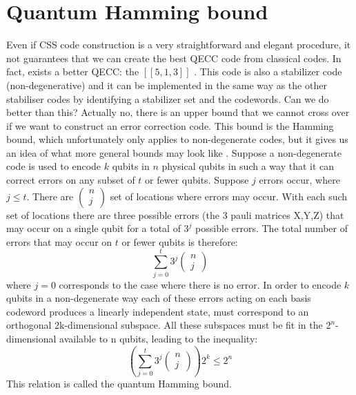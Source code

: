 \section{Quantum Hamming bound}
Even if CSS code construction is a very straightforward and elegant procedure, it not guarantees that we can create the best QECC code from classical codes. In fact, exists a better QECC: the $[[5,1,3]]$ \cite{gottesman1997stabilizer}. This code is also a stabilizer code (non-degenerative) and it can be implemented in the same way as the other stabiliser codes by identifying a stabilizer set and the codewords. Can we do better than this? Actually no, there is an upper bound that we cannot cross over if we want to construct an error correction code. This bound is the Hamming bound, which unfortunately only applies to non-degenerate codes, but it gives us an idea of what more general bounds may look like \cite{SteaneTut}.
\renewcommand{\arraystretch}{0.8}
Suppose a non-degenerate code is used to encode $k$ qubits in $n$ physical qubits in such a way that it can correct errors on any subset of $t$ or fewer qubits. Suppose $j$ errors occur, where $j\leq t$. There are $\left(\begin{array}{c}
     n\\
     j
\end{array}\right)$ set of locations where errors may occur. With each such set of locations there are three possible errors (the 3 pauli matrices X,Y,Z) that may occur on a single qubit for a total of $3^j$ possible errors. The total number of errors that may occur on $t$ or fewer qubits is therefore: 
\begin{equation*}
    \sum_{j=0}^t 3^j\left(\begin{array}{c}
     n\\
     j
\end{array}\right)
\end{equation*}
where $j=0$ corresponds to the case where there is no error. In order to encode $k$ qubits in a non-degenerate way each of these errors acting on each basis codeword produces a linearly independent state, must correspond to an orthogonal 2k-dimensional subspace. All these subspaces must be fit in the $2^n$-dimensional available to n qubits, leading to the inequality:
\begin{equation}
    \left(\sum_{j=0}^t 3^j\left(\begin{array}{c}
     n\\
     j
\end{array}\right)\right)2^k \leq 2^n
\label{Hamming}
\end{equation}
This relation is called the quantum Hamming bound. 

